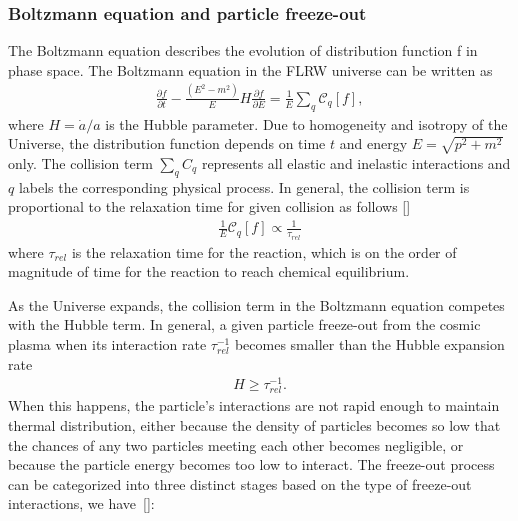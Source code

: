 \subsubsection{Boltzmann equation and particle freeze-out}
The Boltzmann equation describes the evolution of distribution function f in phase space. The Boltzmann equation in the FLRW universe can be written as
\begin{align}
\frac{\partial f}{\partial t}-\frac{\left(E^2-m^2\right)}{E}H\frac{\partial f}{\partial E}=\frac{1}{E}\sum_{q}\mathcal{C}_q[f],
\end{align}
where $H=\dot{a}/a$ is the Hubble parameter. Due to homogeneity and isotropy of the Universe, the distribution function depends on time $t$ and energy $E=\sqrt{p^2+m^2}$ only. The collision term $\sum_qC_q$ represents all elastic and inelastic interactions and $q$ labels the corresponding physical process. In general, the collision term is proportional to the relaxation time for given collision as follows [\cite{ANDERSON1974466}]
\begin{align}
\frac{1}{E}\mathcal{C}_q[f]\propto\frac{1}{\tau_{rel}}
\end{align}
where $\tau_{rel}$ is the relaxation time for the reaction, which is on the order of magnitude of time for the reaction to reach chemical equilibrium. 


As the Universe expands, the collision term in the Boltzmann equation competes with the Hubble term. In general, a given particle freeze-out from the cosmic plasma when its interaction rate $\tau_{rel}^{-1}$ becomes smaller than the Hubble expansion rate
\begin{align}
H\geqslant\tau_{rel}^{-1}.
\end{align}
When this happens, the particle's interactions are not rapid enough to maintain thermal distribution, either because the density of particles becomes so low that the chances of any two particles meeting each other becomes negligible, or because the particle energy becomes too low to interact. The freeze-out process can be categorized into three distinct stages based on the type of freeze-out interactions, we have~[\cite{Birrell:2012gg,Rafelski:2023emw}]:

